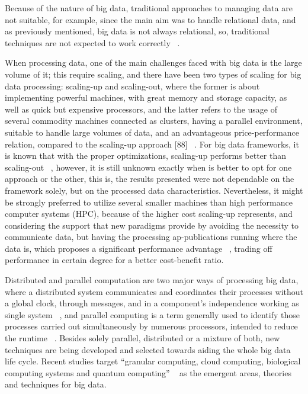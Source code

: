 Because of the nature of big data, traditional approaches to managing data are not
suitable, for example, since the main aim was to handle relational data, and as previously mentioned,  big data is not always relational, so, traditional techniques are not expected to work correctly ~\cite{FUJITSU2015}. 

When processing data, one of the main challenges faced with big data is the large volume of it; this require scaling, and there have been two types of scaling for big data processing: scaling-up and scaling-out, where the former is about implementing powerful machines, with great memory and storage capacity, as well as quick but expensive processors, and the latter refers to the usage of several commodity machines connected as clusters, having a parallel environment, suitable to handle large volumes of data, and an advantageous price-performance relation, compared to the scaling-up approach [88] ~\cite{FUJITSU2015}. For big data frameworks, it is known that with the proper optimizations, scaling-up performs better than scaling-out ~\cite{Appuswamy2013}, however, it is still unknown exactly when is better to opt for one approach or the other,
this is, the results presented were not dependable on the framework solely, but on the
processed data characteristics. Nevertheless, it might be strongly preferred to utilize
several smaller machines than high performance computer systems (HPC), because of
the higher cost scaling-up represents, and considering the support that new paradigms
provide by avoiding the necessity to communicate data, but having the processing ap-publications running where the data is, which proposes a significant performance advantage ~\cite{Tekiner2013}, trading off performance in certain degree for a better cost-benefit ratio.

Distributed and parallel computation are two major ways of processing big data,
where a distributed system communicates and coordinates their processes without a
global clock, through messages, and in a component’s independence working as single system ~\cite{Tanenbaum2007}, and parallel computing is a term generally used to identify those
processes carried out simultaneously by numerous processors, intended to reduce the runtime ~\cite{Almasi1988}. Besides solely parallel, distributed or a mixture of both, new techniques
are being developed and selected towards aiding the whole big data life cycle. 
Recent studies target “granular computing, cloud computing, biological computing systems and quantum computing” ~\cite{PhilipChen2014} as the emergent areas, theories and techniques for big data.

